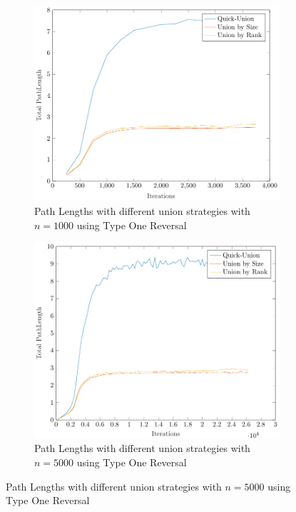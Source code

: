 \begin{figure}[ht]
    \begin{subfigure}{0.32\textwidth}
        \centering
        \includegraphics[width=\textwidth]{../images/plotTORFull1000_PathLength.pdf}
        \caption{Path Lengths with different union strategies with $n = 1000$ using Type One Reversal}
    \end{subfigure}%
    \hfill
    \begin{subfigure}{0.32\textwidth}
        \centering
        \includegraphics[width=\textwidth]{../images/plotTORFull5000_PathLength.pdf}
        \caption{Path Lengths with different union strategies with $n = 5000$ using Type One Reversal}

\end{subfigure}
\end{figure}
